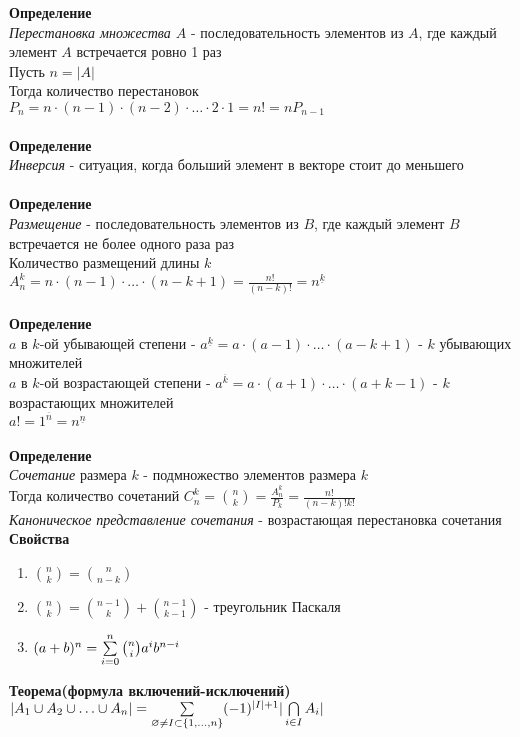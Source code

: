 \documentclass[12pt]{article}
\begin{document}
\textbf{Определение}\\
\textit{Перестановка множества $A$} - последовательность элементов из $A$, где каждый элемент $A$ встречается ровно 1 раз\\
Пусть $n = |A|$\\
Тогда количество перестановок $P_n = n\cdot(n-1)\cdot(n-2)\cdot\ldots\cdot2\cdot1 = n! = nP_{n-1}$\\\\
\textbf{Определение}\\
\textit{Инверсия} - ситуация, когда больший элемент в векторе стоит до меньшего\\\\
\textbf{Определение}\\
\textit{Размещение} - последовательность элементов из $B$, где каждый элемент $B$ встречается не более одного раза раз\\
Количество размещений длины $k$ $A^k_n = n\cdot(n-1)\cdot\ldots\cdot(n-k+1) = \frac{n!}{(n-k)!} = n^{\underline{k}}$\\\\
\textbf{Определение}\\
$a$ в $k$-ой убывающей степени - $a^{\underline{k}} = a\cdot(a-1)\cdot\ldots\cdot(a-k+1)$ - $k$ убывающих множителей\\
$a$ в $k$-ой возрастающей степени - $a^{\overline{k}} = a\cdot(a+1)\cdot\ldots\cdot(a+k-1)$ - $k$ возрастающих множителей\\
$a! = 1^{\overline{n}} = n^{\underline{n}}$\\\\
\textbf{Определение}\\
\textit{Сочетание} размера $k$ - подмножество элементов размера $k$\\
Тогда количество сочетаний $C_n^k = \binom{n}{k} = \frac{A_n^k}{P_k} = \frac{n!}{(n-k)!k!}$\\
\textit{Каноническое представление сочетания} - возрастающая перестановка сочетания\\
\textbf{Свойства}
\begin{enumerate}
    \item $\binom{n}{k} = \binom{n}{n-k}$
    \item $\binom{n}{k} = \binom{n-1}{k} + \binom{n-1}{k-1}$ - треугольник Паскаля
    \item $(a+b)^n = \sum\limits_{i=0}^n \binom{n}{i}a^ib^{n-i}$
\end{enumerate}
\textbf{Теорема(формула включений-исключений)}\\
$|A_1\cup A_2\cup \ldots\cup A_n| = \sum\limits_{\varnothing \neq I \subset \{1,\ldots,n\}} (-1)^{|I|+1}|\bigcap\limits_{i \in I} A_i|$\\
\end{document}
